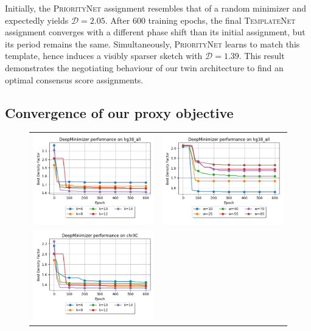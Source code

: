 Initially, the \textsc{PriorityNet} assignment resembles that of a random minimizer and expectedly yields $\mathcal{D}=2.05$. After $600$ training epochs, the final \textsc{TemplateNet} assignment converges with a different phase shift than its initial assignment, but its period remains the same. Simultaneously, \textsc{PriorityNet} learns to match this template, hence induces a visibly sparser sketch with $\mathcal{D}=1.39$. This result demonstrates the negotiating behaviour of our twin architecture to find an optimal consensus score assignments.

\subsection{Convergence of our proxy objective} 
\begin{figure}[h]
\begin{tabular}{cc}
\includegraphics[width=0.46\columnwidth]{minimizer_plots/mznet_hg38_alL_w14.png} & 
\includegraphics[width=0.46\columnwidth]{minimizer_plots/mznet_hg38_all_k13.png} 
\\
\includegraphics[width=0.46\columnwidth]{minimizer_plots/mznet_chrXC_w14.png} & 

\end{tabular}
\end{figure}
